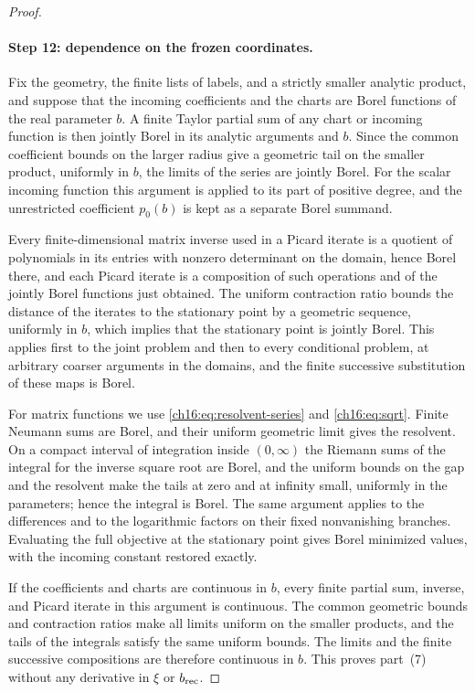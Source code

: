 \begin{proof}
\paragraph{Step 12: dependence on the frozen coordinates.}
Fix the geometry, the finite lists of labels, and a strictly smaller analytic product, and suppose that the incoming coefficients and the charts are Borel functions of the real parameter $b$. A finite Taylor partial sum of any chart or incoming function is then jointly Borel in its analytic arguments and $b$. Since the common coefficient bounds on the larger radius give a geometric tail on the smaller product, uniformly in $b$, the limits of the series are jointly Borel. For the scalar incoming function this argument is applied to its part of positive degree, and the unrestricted coefficient $p_0(b)$ is kept as a separate Borel summand.

Every finite-dimensional matrix inverse used in a Picard iterate is a quotient of polynomials in its entries with nonzero determinant on the domain, hence Borel there, and each Picard iterate is a composition of such operations and of the jointly Borel functions just obtained. The uniform contraction ratio bounds the distance of the iterates to the stationary point by a geometric sequence, uniformly in $b$, which implies that the stationary point is jointly Borel. This applies first to the joint problem and then to every conditional problem, at arbitrary coarser arguments in the domains, and the finite successive substitution of these maps is Borel.

For matrix functions we use \eqref{ch16:eq:resolvent-series} and \eqref{ch16:eq:sqrt}. Finite Neumann sums are Borel, and their uniform geometric limit gives the resolvent. On a compact interval of integration inside $(0,\infty)$ the Riemann sums of the integral for the inverse square root are Borel, and the uniform bounds on the gap and the resolvent make the tails at zero and at infinity small, uniformly in the parameters; hence the integral is Borel. The same argument applies to the differences and to the logarithmic factors on their fixed nonvanishing branches. Evaluating the full objective at the stationary point gives Borel minimized values, with the incoming constant restored exactly.

If the coefficients and charts are continuous in $b$, every finite partial sum, inverse, and Picard iterate in this argument is continuous. The common geometric bounds and contraction ratios make all limits uniform on the smaller products, and the tails of the integrals satisfy the same uniform bounds. The limits and the finite successive compositions are therefore continuous in $b$. This proves part~(7) without any derivative in $\xi$ or $b_{\mathrm{rec}}$.


\end{proof}
